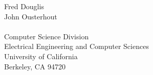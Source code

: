 \pagestyle{empty}
\textwidth=20.3cm
\textheight=8in
\oddsidemargin=-1in
\evensidemargin=-1in
\topmargin=0in

\begin{titlepage}
\begin{center}
\large
Fred Douglis \\
John Ousterhout \\
\mbox{} \\ %
Computer Science Division \\
Electrical Engineering and Computer Sciences \\
University of California \\
Berkeley, CA 94720
\normalsize
\end{center}
\end{titlepage}


